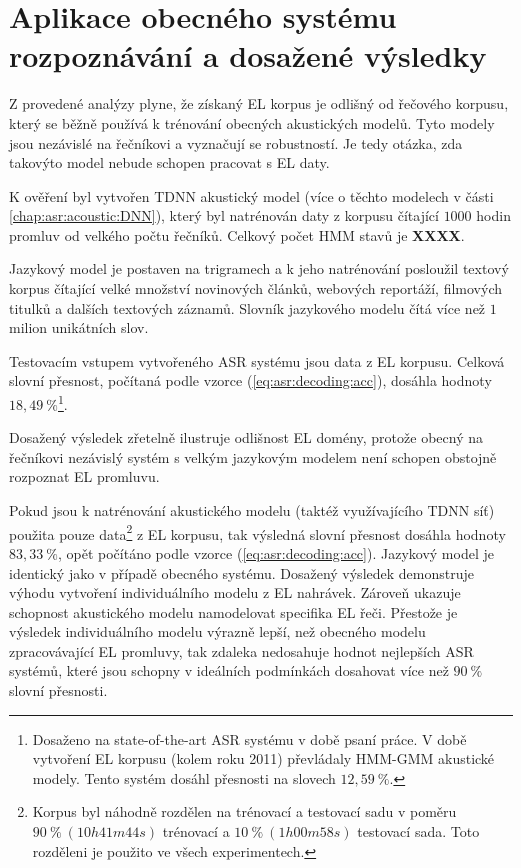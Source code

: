 \section{Aplikace obecného systému rozpoznávání a dosažené výsledky}
\label{chap:construction:results}

Z provedené analýzy plyne, že získaný EL korpus je odlišný od  řečového korpusu, který se běžně používá k trénování obecných akustických modelů. Tyto modely jsou nezávislé na řečníkovi a vyznačují se robustností. Je tedy otázka, zda takovýto model nebude schopen pracovat s EL daty.

K ověření byl vytvořen TDNN akustický model (více o těchto modelech v části \ref{chap:asr:acoustic:DNN}), který byl natrénován daty z korpusu čítající $1000$ hodin promluv od velkého počtu řečníků. Celkový počet HMM stavů je \textbf{XXXX}.

Jazykový model je postaven na trigramech a k jeho natrénování posloužil textový korpus čítající velké množství novinových článků, webových reportáží, filmových titulků a dalších textových záznamů. Slovník jazykového modelu čítá více než $1$ milion unikátních slov.

Testovacím vstupem vytvořeného ASR systému jsou data z EL korpusu. Celková slovní přesnost, počítaná podle vzorce (\ref{eq:asr:decoding:acc}), dosáhla hodnoty $18,49\ \%$\footnote{Dosaženo na state-of-the-art ASR systému v době psaní práce. V době vytvoření EL korpusu (kolem roku 2011) převládaly HMM-GMM akustické modely. Tento systém dosáhl přesnosti na slovech $12,59\ \%$.}.

Dosažený výsledek zřetelně ilustruje odlišnost EL domény, protože obecný na řečníkovi nezávislý systém s velkým jazykovým modelem není schopen obstojně rozpoznat EL promluvu.

Pokud jsou k natrénování akustického modelu (taktéž využívajícího TDNN síť) použita pouze data\footnote{Korpus byl náhodně rozdělen na trénovací a testovací sadu v poměru $90\ \%\ (10h41m44s)$ trénovací a $10\ \%\ (1h00m58s)$ testovací sada. Toto rozděleni je použito ve všech experimentech.} z EL korpusu, tak výsledná slovní přesnost dosáhla hodnoty $83,33\ \%$, opět počítáno podle vzorce (\ref{eq:asr:decoding:acc}). Jazykový model je identický jako v případě obecného systému. Dosažený výsledek demonstruje výhodu vytvoření individuálního modelu z EL nahrávek. Zároveň ukazuje schopnost akustického modelu namodelovat specifika EL řeči. Přestože je výsledek individuálního modelu výrazně lepší, než obecného modelu zpracovávající EL promluvy, tak zdaleka nedosahuje hodnot nejlepších ASR systémů, které jsou schopny v ideálních podmínkách dosahovat více než $90\ \%$ slovní přesnosti.


